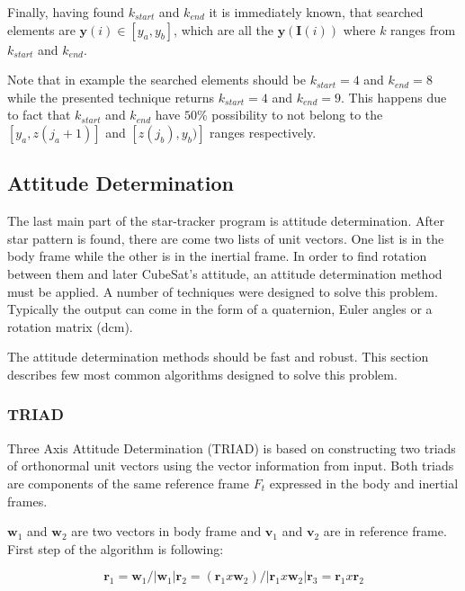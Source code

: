 \documentclass[12pt,a4paper,oneside]{article}
\begin{document}
Finally, having found $k_{start}$ and $k_{end}$ it is immediately known, that searched elements are $\bm{y}(i) \in [y_a, y_b]$, which are all the $\bm{y}(\bm{I}(i))$ where $k$ ranges from $k_{start}$ and $k_{end}$.

Note that in example the searched elements should be $k_{start} = 4$ and $k_{end} = 8$ while the presented technique returns $k_{start} = 4$ and $k_{end} = 9$. This happens due to fact that $k_{start}$ and $k_{end}$ have $50\%$ possibility to not belong to the $[y_a, z(j_a +1)]$ and $[z(j_b), y_b)]$ ranges respectively.

\subsection{Attitude Determination}

The last main part of the star-tracker program is attitude determination. After star pattern is found, there are come two lists of unit vectors. One list is in the body frame while the other is in the inertial frame. In order to find rotation between them and later CubeSat's attitude, an attitude determination method must be applied. A number of techniques were designed to solve this problem. Typically the output can come in the form of a quaternion, Euler angles or a rotation matrix (\gls{dcm}).

The attitude determination methods should be fast and robust. This section describes few most common algorithms designed to solve this problem.


\subsubsection{TRIAD}

Three Axis Attitude Determination (TRIAD) is based on constructing two triads of orthonormal unit vectors using the vector information from input. Both triads are components of the same reference frame $F_t$ expressed in the body and inertial frames\cite{hall2003spacecraft}.

$\bm{w}_1$ and $\bm{w}_2$ are two vectors in body frame and $\bm{v}_1$ and $\bm{v}_2$ are in reference frame. First step of the algorithm is following:

\begin{subequations}
\begin{equation}
\bm{r}_1 = \bm{w}_1/|\bm{w}_1|
\end{equation}
\begin{equation}
\bm{r}_2 = (\bm{r}_1 x \bm{w}_2) /|\bm{r}_1 x \bm{w}_2|
\end{equation}
\begin{equation}
\bm{r}_3 = \bm{r}_1 x \bm{r}_2
\end{equation}
\end{subequations}
\end{document}
